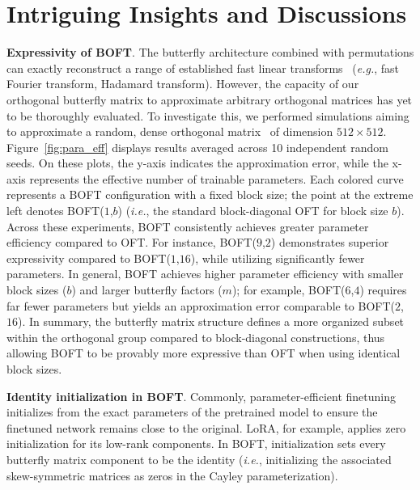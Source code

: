 \section{Intriguing Insights and Discussions}

\textbf{Expressivity of BOFT}. The butterfly architecture combined with permutations can exactly reconstruct a range of established fast linear transforms~\cite{dao2019learning,dao2019kaleidoscope} (\emph{e.g.}, fast Fourier transform, Hadamard transform). However, the capacity of our orthogonal butterfly matrix to approximate arbitrary orthogonal matrices has yet to be thoroughly evaluated. To investigate this, we performed simulations aiming to approximate a random, dense orthogonal matrix~\cite{anderson1987generation} of dimension $512\times 512$. Figure~\ref{fig:para_eff} displays results averaged across 10 independent random seeds. On these plots, the y-axis indicates the approximation error, while the x-axis represents the effective number of trainable parameters. Each colored curve represents a BOFT configuration with a fixed block size; the point at the extreme left denotes BOFT($1$,$b$) (\emph{i.e.}, the standard block-diagonal OFT for block size $b$). Across these experiments, BOFT consistently achieves greater parameter efficiency compared to OFT. For instance, BOFT($9$,$2$) demonstrates superior expressivity compared to BOFT($1$,$16$), while utilizing significantly fewer parameters. In general, BOFT achieves higher parameter efficiency with smaller block sizes ($b$) and larger butterfly factors ($m$); for example, BOFT($6$,$4$) requires far fewer parameters but yields an approximation error comparable to BOFT($2$,$16$). In summary, the butterfly matrix structure defines a more organized subset within the orthogonal group compared to block-diagonal constructions, thus allowing BOFT to be provably more expressive than OFT when using identical block sizes.

\textbf{Identity initialization in BOFT}. Commonly, parameter-efficient finetuning initializes from the exact parameters of the pretrained model to ensure the finetuned network remains close to the original. LoRA, for example, applies zero initialization for its low-rank components. In BOFT, initialization sets every butterfly matrix component to be the identity (\emph{i.e.}, initializing the associated skew-symmetric matrices as zeros in the Cayley parameterization).

